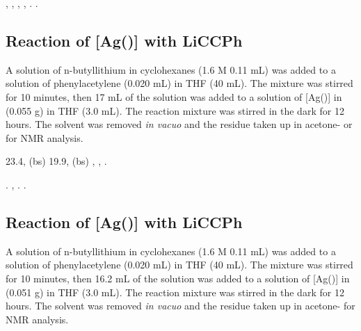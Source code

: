 \begin{sloppypar}
,
,
,
,
.
.
\end{sloppypar}

\subsection*{Reaction of \texorpdfstring{[Ag(\tButhixantphos)]} A with LiCCPh}

A solution of n-butyllithium in cyclohexanes (1.6 M 0.11 mL) was added to a solution of phenylacetylene (0.020 mL) in THF (40 mL).  The mixture was stirred for 10 minutes, then 17 mL of the solution was added to a solution of [Ag(\tButhixantphos)] in (0.055 g) in THF (3.0 mL).  The reaction mixture was stirred in the dark for 12 hours.  The solvent was removed \emph{in vacuo} and the residue taken up in acetone- or  for NMR analysis.   

\begin{sloppypar}
23.4, (bs)
19.9, (bs)
,
,
.
\end{sloppypar}

\begin{sloppypar}
.
,
.
.
\end{sloppypar}

\subsection*{Reaction of \texorpdfstring{[Ag(\tBuxantphos)]} A with LiCCPh}

A solution of n-butyllithium in cyclohexanes (1.6 M 0.11 mL) was added to a solution of phenylacetylene (0.020 mL) in THF (40 mL).  The mixture was stirred for 10 minutes, then 16.2 mL of the solution was added to a solution of [Ag(\tBuxantphos)] in (0.051 g) in THF (3.0 mL).  The reaction mixture was stirred in the dark for 12 hours.  The solvent was removed \emph{in vacuo} and the residue taken up in acetone- for NMR analysis.   

